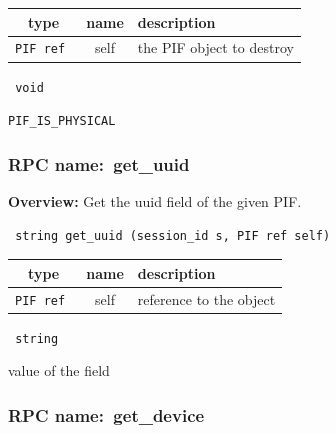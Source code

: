 
 
\vspace{0.3cm}
\begin{tabular}{|c|c|p{7cm}|}
 \hline
{\bf type} & {\bf name} & {\bf description} \\ \hline
{\tt PIF ref } & self & the PIF object to destroy \\ \hline 

\end{tabular}

\vspace{0.3cm}

{\tt 
void
}



\vspace{0.3cm}

 {\tt PIF\_IS\_PHYSICAL}

\vspace{0.6cm}
\subsubsection{RPC name:~get\_uuid}

{\bf Overview:} 
Get the uuid field of the given PIF.

\begin{verbatim} string get_uuid (session_id s, PIF ref self)\end{verbatim}



 
\vspace{0.3cm}
\begin{tabular}{|c|c|p{7cm}|}
 \hline
{\bf type} & {\bf name} & {\bf description} \\ \hline
{\tt PIF ref } & self & reference to the object \\ \hline 

\end{tabular}

\vspace{0.3cm}

{\tt 
string
}


value of the field
\vspace{0.3cm}
\vspace{0.3cm}
\vspace{0.3cm}
\subsubsection{RPC name:~get\_device}

